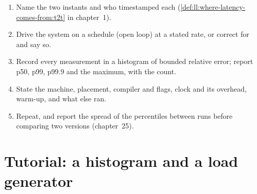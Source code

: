 \begin{method}\label{met:ll:measuring-latency:report}
\begin{enumerate}
\item Name the two instants and who timestamped each (\cref{def:ll:where-latency-comes-from:t2t} in chapter~1).
\item Drive the system on a schedule (open loop) at a stated rate, or correct for  and say so.
\item Record every measurement in a histogram of bounded relative error; report p50, p99, p99.9 and the maximum, with the
count.
\item State the machine, placement, compiler and flags, clock and its overhead, warm-up, and what else ran.
\item Repeat, and report the spread of the percentiles between runs before comparing two versions (chapter~25).
\end{enumerate}
\end{method}

\section{Tutorial: a histogram and a load generator}\label{tut:ll:measuring-latency:tut}

